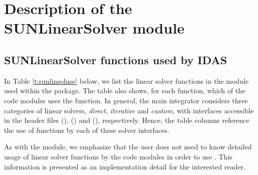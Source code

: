 \chapter{Description of the SUNLinearSolver module}\label{s:sunlinsol}



\section{SUNLinearSolver functions used by IDAS}

In Table \ref{t:sunlinsoluse} below, we list the linear solver
functions in the {\sunlinsol} module used within the {\idas} package.
The table also shows, for each function, which of the code modules uses
the function.  In general, the main {\idas} integrator considers
three categories of linear solvers, \emph{direct}, \emph{iterative}
and \emph{custom}, with interfaces accessible in the {\idas} header
files  ({\idadls}), 
({\idaspils}) and  ({\idacls}), respectively.
Hence, the table columns reference the use of {\sunlinsol}
functions by each of these solver interfaces.

As with the {\sunmatrix} module, we emphasize that the {\idas} user
does not need to know detailed usage of linear solver functions by the
{\idas} code modules in order to use {\idas}. This information is
presented as an implementation detail for the interested reader.

